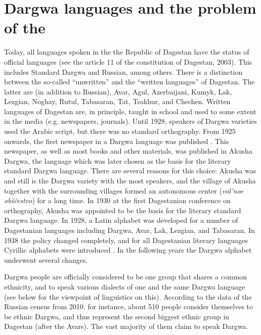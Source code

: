 
\section{Dargwa languages and the problem of the }
\label{sec:Dargwa languages and the problem of the Dargwa ethnicity}

Today, all languages spoken in the the Republic of Dagestan have the status of official languages (see the article 11 of the constitution of Dagestan, 2003). This includes Standard Dargwa and Russian, among others. There is a distinction between the so-called ``unwritten'' and the ``written languages'' of Dagestan. The latter are (in addition to Russian), Avar, Agul, Azerbaijani, Kumyk, Lak, Lezgian, Noghay, Rutul, Tabasaran, Tat, Tsakhur, and Chechen. Written languages of Dagestan are, in principle, taught in school and used to some extent in the media (e.g. newspapers, journals). Until 1928, speakers of Dargwa varieties used the Arabic script, but there was no standard orthography. From 1925 onwards, the first newspaper in a Dargwa language was published \citep[15]{Abdullaev1954}. This newspaper, as well as most books and other materials, was published in Akusha Dargwa, the language which was later chosen as the basis for the literary standard Dargwa language. There are several reasons for this choice: Akusha was and still is the Dargwa variety with the most speakers, and the village of Akusha together with the surrounding villages formed an autonomous center (\textit{vol'noe obščestvo}) for a long time. In 1930 at the first Dagestanian conference on orthography, Akusha was appointed to be the basis for the literary standard Dargwa language. In 1928, a Latin alphabet was developed for a number of Dagestanian languages including Dargwa, Avar, Lak, Lezgian, and Tabasaran. In 1938 the policy changed completely, and for all Dagestanian literary languages Cyrillic alphabets were introduced \citep[48]{Grenoble2003}. In the following years the Dargwa alphabet underwent several changes.

Dargwa people are officially considered to be one group that shares a common ethnicity, and to speak various dialects of one and the same Dargwa language (see below for the viewpoint of linguistics on this). According to the data of the Russian census from 2010, for instance, about 510 people consider themselves to be ethnic Dargwa, and thus represent the second biggest ethnic group in Dagestan (after the Avars). The vast majority of them claim to speak Dargwa.

